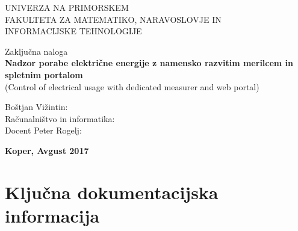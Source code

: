 \documentclass[12pt,a4paper,titlepage,openany]{report}
\begin{document}
\pagestyle{empty}
\begin{center}
\noindent \large UNIVERZA NA PRIMORSKEM\\
\large FAKULTETA ZA MATEMATIKO, NARAVOSLOVJE IN\\
INFORMACIJSKE TEHNOLOGIJE


\normalsize
\vspace{6cm}
Zaključna naloga\\
\textbf{\large Nadzor porabe električne energije z namensko razvitim merilcem in  spletnim portalom}\\
\normalsize
(Control of electrical usage with dedicated measurer and  web portal)\\
\end{center}

\begin{flushleft}
\vspace{5cm}
\noindent Boštjan Vižintin:
\\
\noindent Računalništvo in informatika:
\\
\noindent Docent Peter Rogelj:
\\
\end{flushleft}

\vspace{4cm}
\begin{center}
\large \textbf{Koper, Avgust 2017}
\end{center}
\newpage

\pagestyle{fancy}

\section*{Ključna dokumentacijska informacija}
\end{document}
